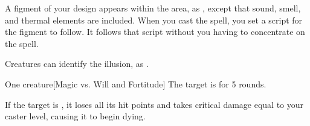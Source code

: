 \begin{spellheader}
    \spelldur{\durmed \dismissable}
\end{spellheader}
\begin{spelleffects}
    \spelleffect A figment of your design appears within the area, as , except that sound, smell, and thermal elements are included. When you cast the spell, you set a script for the figment to follow. It follows that script without you having to concentrate on the spell.
\end{spelleffects}
\begin{spellfooter}
    \spellnotes Creatures can identify the illusion, as .
\end{spellfooter}

\begin{spellheader}
    \spellrng{\rngmed}
\end{spellheader}
\begin{spelleffects}
    \begin{spelltarget}{One creature}[Magic vs. Will and Fortitude]
        \spellsuccess[Will] The target is \shaken for 5 rounds.

         If the target is \bloodied, it loses all its hit points and takes critical damage equal to your caster level, causing it to begin dying.
    \end{spelltarget}
\end{spelleffects}
\begin{spellfooter}
    
\end{spellfooter}

